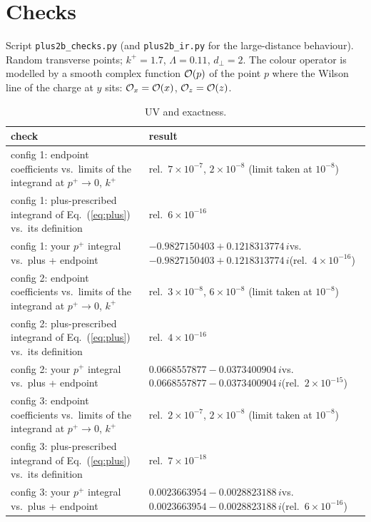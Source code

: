 \documentclass[10pt]{article}
\begin{document}
\section{Checks}\label{sec:checks}
Script \texttt{plus2b\_checks.py} (and \texttt{plus2b\_ir.py} for the large-distance behaviour). Random transverse points; $k^+=1.7$, $\Lambda=0.11$, $d_\perp=2$. The colour operator is modelled by a smooth complex function ${\cal O}(p)$ of the point $p$ where the Wilson line of the charge at $y$ sits: ${\cal O}_x={\cal O}(x)$, ${\cal O}_z={\cal O}(z)$.
\begin{center}\small
\begin{longtable}{@{}p{}p{}@{}}
\caption{UV and exactness.}\label{tab:checks}\\
\toprule
check & result\\\midrule
config 1: endpoint coefficients vs.\ limits of the integrand at $p^+\to0$, $k^+$ & rel.\ $7\times10^{-7}$, $2\times10^{-8}$ (limit taken at $10^{-8}$)\\
config 1: plus-prescribed integrand of Eq.~(\ref{eq:plus}) vs.\ its definition & rel.\ $6\times10^{-16}$\\
config 1: your $p^+$ integral vs.\ plus + endpoint & $-0.9827150403+0.1218313774\,i$\newline vs.\ $-0.9827150403+0.1218313774\,i$\newline (rel.\ $4\times10^{-16}$)\\
config 2: endpoint coefficients vs.\ limits of the integrand at $p^+\to0$, $k^+$ & rel.\ $3\times10^{-8}$, $6\times10^{-8}$ (limit taken at $10^{-8}$)\\
config 2: plus-prescribed integrand of Eq.~(\ref{eq:plus}) vs.\ its definition & rel.\ $4\times10^{-16}$\\
config 2: your $p^+$ integral vs.\ plus + endpoint & $0.0668557877-0.0373400904\,i$\newline vs.\ $0.0668557877-0.0373400904\,i$\newline (rel.\ $2\times10^{-15}$)\\
config 3: endpoint coefficients vs.\ limits of the integrand at $p^+\to0$, $k^+$ & rel.\ $2\times10^{-7}$, $2\times10^{-8}$ (limit taken at $10^{-8}$)\\
config 3: plus-prescribed integrand of Eq.~(\ref{eq:plus}) vs.\ its definition & rel.\ $7\times10^{-18}$\\
config 3: your $p^+$ integral vs.\ plus + endpoint & $0.0023663954-0.0028823188\,i$\newline vs.\ $0.0023663954-0.0028823188\,i$\newline (rel.\ $6\times10^{-16}$)\\

\end{longtable}
\end{center}
\end{document}
